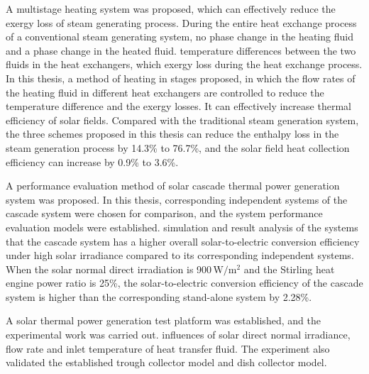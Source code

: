 {A multistage heating system was proposed, which can effectively reduce the exergy loss of steam generating process. During the entire heat exchange process of a conventional steam generating system, no phase change  in the heating fluid and a phase change  in the heated fluid.  temperature differences  between the two fluids in the heat exchangers, which  exergy loss during the heat exchange process. In this thesis, a method of heating in stages  proposed, in which the flow rates of the heating fluid in different heat exchangers are controlled to reduce the temperature difference and the exergy losses. It can effectively increase thermal efficiency of solar fields. Compared with the traditional steam generation system, the three schemes proposed in this thesis can reduce the enthalpy loss in the steam generation process by 14.3\% to 76.7\%, and the solar field heat collection efficiency can increase by 0.9\% to 3.6\%.

A performance evaluation method of solar cascade thermal power generation system was proposed. In this thesis, corresponding independent systems of the cascade system were chosen for comparison, and the system performance evaluation models were established.  simulation and result analysis of the systems that the cascade system has a higher overall solar-to-electric conversion efficiency under high solar irradiance compared to its corresponding independent systems. When the solar normal direct irradiation is 900$\,\mathrm{W/m^2}$ and the Stirling heat engine power ratio is 25\%, the solar-to-electric conversion efficiency of the cascade system is higher than the corresponding stand-alone system by 2.28\%.

A solar thermal power generation test platform was established, and the experimental work was carried out.  influences of solar direct normal irradiance, flow rate and inlet temperature of heat transfer fluid.
The experiment also validated the established trough collector model and dish collector model.

}
